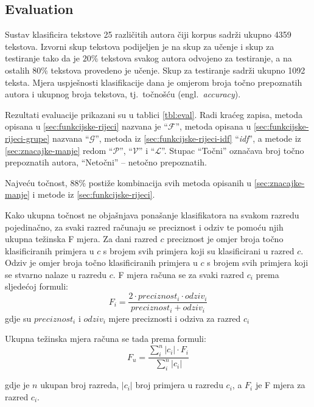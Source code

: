 \documentclass[11pt,english]{article}
\newcommand{\engl}[1]{(engl.~\emph{#1})}
\begin{document}
\begin{multicols}{2}
\section{Evaluation}
\label{sec:evaluacija}
Sustav klasificira tekstove 25 različitih autora čiji korpus sadrži ukupno 4359
tekstova. Izvorni skup tekstova podijeljen je na skup za učenje i skup za testiranje
tako da je $20\%$ tekstova svakog autora odvojeno za testiranje, a na
ostalih $80\%$ tekstova provedeno je učenje. Skup za testiranje sadrži
ukupno 1092 teksta. Mjera uspješnosti klasifikacije dana je omjerom broja točno
prepoznatih autora i ukupnog broja tekstova, tj.~točnošću \engl{accuracy}.

Rezultati evaluacije prikazani su u tablici \ref{tbl:eval}. Radi kraćeg zapisa,
metoda opisana u \ref{sec:funkcijske-rijeci} nazvana je ``$\mathcal{F}$'', metoda
opisana u \ref{sec:funkcijske-rijeci-grupe} nazvana ``$\mathcal{G}$'',
metoda iz \ref{sec:funkcijske-rijeci-idf} ``\emph{idf}'', a metode iz
\ref{sec:znacajke-manje} redom ``$\mathcal{P}$'', ``$\mathcal{V}$'' i
``$\mathcal{L}$''. Stupac ``Točni'' označava broj točno prepoznatih autora,
``Netočni'' -- netočno prepoznatih.

Najveću točnost, 88\% postiže kombinacija svih metoda opisanih u
\ref{sec:znacajke-manje} i metode iz \ref{sec:funkcijske-rijeci}.

Kako ukupna točnost ne objašnjava ponašanje klasifikatora na svakom razredu
pojedinačno, za svaki razred računaju se preciznost i odziv te pomoću njih
ukupna težinska F mjera. Za dani razred $c$ preciznost je omjer broja točno
klasificiranih primjera u $c$ s brojem svih primjera koji su klasificirani u
razred $c$. Odziv je omjer broja točno klasificiranih primjera u $c$ s brojem
svih primjera koji se stvarno nalaze u razredu $c$. F mjera računa se za svaki
razred $c_i$ prema sljedećoj formuli:
\begin{equation}
F_i = \frac{2 \cdot preciznost_i \cdot odziv_i}{preciznost_i + odziv_i}
\end{equation}
gdje su $preciznost_i$ i $odziv_i$ mjere preciznosti i odziva za razred $c_i$

Ukupna težinska mjera računa se tada prema formuli:
\begin{equation}
F_u = \frac{\sum^{n}_i |c_i|\cdot F_i}{\sum^n_i|c_i|}
\end{equation}

gdje je $n$ ukupan broj razreda, $|c_i|$ broj primjera u razredu $c_i$, a $F_i$
je F mjera za razred $c_i$.


\end{multicols}
\end{document}
